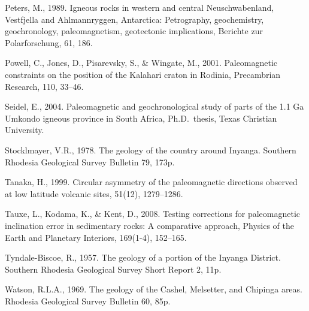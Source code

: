 \documentclass{article}
\begin{document}
Peters, M., 1989. Igneous rocks in western and central Neuschwabenland,
Vestfjella and Ahlmannryggen, Antarctica: Petrography, geochemistry,
geochronology, paleomagnetism, geotectonic implications, Berichte zur
Polarforschung, 61, 186.

Powell, C., Jones, D., Pisarevsky, S., \& Wingate, M., 2001.
Paleomagnetic constraints on the position of the Kalahari craton in
Rodinia, Precambrian Research, 110, 33--46.

Seidel, E., 2004. Paleomagnetic and geochronological study of parts of
the 1.1 Ga Umkondo igneous province in South Africa, Ph.D.~thesis, Texas
Christian University.

Stocklmayer, V.R., 1978. The geology of the country around Inyanga.
Southern Rhodesia Geological Survey Bulletin 79, 173p.

Tanaka, H., 1999. Circular asymmetry of the paleomagnetic directions
observed at low latitude volcanic sites, 51(12), 1279--1286.

Tauxe, L., Kodama, K., \& Kent, D., 2008. Testing corrections for
paleomagnetic inclination error in sedimentary rocks: A comparative
approach, Physics of the Earth and Planetary Interiors, 169(1-4),
152--165.

Tyndale-Biscoe, R., 1957. The geology of a portion of the Inyanga
District. Southern Rhodesia Geological Survey Short Report 2, 11p.

Watson, R.L.A., 1969. The geology of the Cashel, Melsetter, and Chipinga
areas. Rhodesia Geological Survey Bulletin 60, 85p.


    
    
    
    
\end{document}
